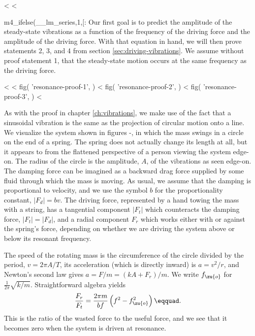 <%
<%


m4_ifelse(__lm_series,1,[:
Our first goal is to predict the amplitude of the steady-state
vibrations as a function of the frequency of the driving
force and the amplitude of the driving force. With that
equation in hand, we will then prove statements 2, 3, and 4
from  section \ref{sec:driving-vibrations}. We assume without proof statement
1, that the steady-state motion occurs at the same frequency
as the driving force.

<%
<%
  fig(
    'resonance-proof-1',
  )
\spacebetweenfigs
<%
  fig(
    'resonance-proof-2',
  )
\spacebetweenfigs
<%
  fig(
    'resonance-proof-3',
  )
<%

As with the proof in chapter \ref{ch:vibrations}, we make use of
the fact that a sinusoidal vibration is the same as the
projection of circular motion onto a line. We visualize the
system shown in figures -, in which the mass swings in a
circle on the end of a spring. The spring does not actually
change its length at all, but it appears to from the
flattened perspective of a person viewing the system
edge-on. The radius of the circle is the amplitude, $A$, of
the vibrations as seen edge-on. The damping force can be
imagined as a backward drag force supplied by some fluid
through which the mass is moving. As usual, we assume that
the damping is proportional to velocity, and we use the
symbol $b$ for the proportionality constant, $|F_d|=bv$.
The driving force, represented by a hand towing the mass
with a string, has a tangential component $|F_t|$ which
counteracts the damping force, $|F_t|=|F_d|$, and a radial
component $F_r$ which works either with or against the
spring's force, depending on whether we are driving the
system above or below its resonant frequency.

The speed of the rotating mass is the circumference of the
circle divided by the period, $v=2\pi A/T$, its acceleration
(which is directly inward) is $a=v^2/r$, and Newton's second
law gives $a=F/m=(kA+F_r)/m$. We write $f_\zu{o}$ for
$\frac{1}{2\pi}\sqrt{k/m}$. Straightforward algebra yields
\begin{equation}
 \frac{F_r}{F_t} = \frac{2\pi m}{bf}\left(f^2-f_\zu{o}^2\right)\eqquad.
\end{equation}
This is the ratio of the wasted force to the useful force,
and we see that it becomes zero when the system is
driven at resonance.

